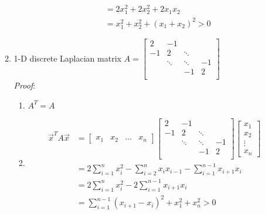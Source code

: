 \documentclass[11pt]{article}
\begin{document}
\begin{enumerate}
\begin{enumerate}
\begin{enumerate}
\begin{align*}
&= 2x_1^2 + 2x_2^2 +2x_1 x_2 \\
&= x_1^2 +x_2^2 + (x_1 +x_2)^2 > 0
\end{align*}
\end{enumerate}
\item 1-D discrete Laplacian matrix
$A = \begin{bmatrix}
2& -1& 	&\\
-1& 2 & \ddots&	\\
&\ddots &\ddots&-1\\
&&-1&2\\
\end{bmatrix}$\\
\textit{Proof}:
\begin{enumerate}
\item $A^T =A$
\item \begin{align*}
\vec{x}^T A \vec{x} &=  \begin{bmatrix}
x_1 & x_2 & \dots & x_n
\end{bmatrix} \begin{bmatrix}
2& -1& 	&\\
-1& 2 & \ddots&	\\
&\ddots &\ddots&-1\\
&&-1&2\\
\end{bmatrix} \begin{bmatrix}
x_1\\
x_2\\
\vdots\\
x_n
\end{bmatrix}\\
& = 2 \sum_{i=1}^{n} x_i^2 - \sum_{i=2}^{n} x_{i} x_{i-1} - \sum_{i=1}^{n-1} x_{i+1} x_{i} \\
& = 2 \sum_{i=1}^{n} x_i^2 - 2 \sum_{i=1}^{n-1} x_{i+1} x_{i}\\
& = \sum_{i=1}^{n-1}(x_{i+1} - x_{i})^2 + x_1^2 +x_n^2  > 0
\end{align*}
\end{enumerate}
\end{enumerate}
\end{enumerate}

\newpage
\end{document}
